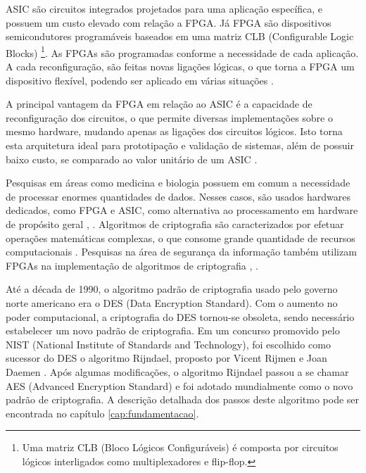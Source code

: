 \documentclass[
	12pt,				%
	twoside,			%
	a4paper,			%
	chapter=TITLE,		%
	english,			%
	brazil				%
	]{tcc}
\begin{document}
ASIC são circuitos integrados projetados para uma aplicação específica, e possuem um custo elevado com relação a FPGA. Já FPGA são dispositivos semicondutores programáveis baseados em uma matriz CLB (Configurable Logic Blocks) \footnote{Uma matriz CLB (Bloco Lógicos Configuráveis) é composta por circuitos lógicos interligados como multiplexadores e flip-flop.}.
As FPGAs são programadas conforme a necessidade de cada aplicação. A cada reconfiguração, são feitas novas ligações lógicas, o que torna a FPGA um dispositivo flexível, podendo ser aplicado em várias situações \cite{xilinxfpga}.

A principal vantagem da FPGA em relação ao ASIC é a capacidade de reconfiguração dos circuitos, o que permite diversas implementações sobre o mesmo hardware, mudando apenas as ligações dos circuitos lógicos. Isto torna esta arquitetura ideal para prototipação e validação de sistemas, além de possuir baixo custo, se comparado ao valor unitário de um ASIC \cite{gaj2009fpga}.

Pesquisas em áreas como medicina e biologia possuem em comum a necessidade de processar enormes quantidades de dados. Nesses casos, são usados hardwares dedicados, como FPGA e ASIC, como alternativa ao processamento em hardware de propósito geral \cite{MolecularBiology}, \cite{BiologicalSequenceAligment}. Algoritmos de criptografia são caracterizados por efetuar operações matemáticas complexas, o que consome grande quantidade de recursos computacionais \cite{deshpande2009fpga}. Pesquisas na área de segurança da informação também utilizam FPGAs na implementação de algoritmos de criptografia \cite{deshpande2009fpga}, \cite{almeidaconstruccao}.


Até a década de 1990, o algoritmo padrão de criptografia usado pelo governo norte americano era o DES (Data Encryption Standard). Com o aumento no poder computacional, a criptografia do DES tornou-se obsoleta, sendo necessário estabelecer um novo padrão de criptografia. Em um concurso promovido pelo NIST (National Institute of Standards and Technology), foi escolhido como sucessor do DES o algoritmo Rijndael, proposto por Vicent Rijmen e Joan Daemen \cite{pub197}. Após algumas modificações, o algoritmo Rijndael passou a se chamar AES (Advanced Encryption Standard) e foi adotado mundialmente como o novo padrão de criptografia. A descrição detalhada dos passos deste algoritmo pode ser encontrada no capítulo \ref{cap:fundamentacao}.
\end{document}
